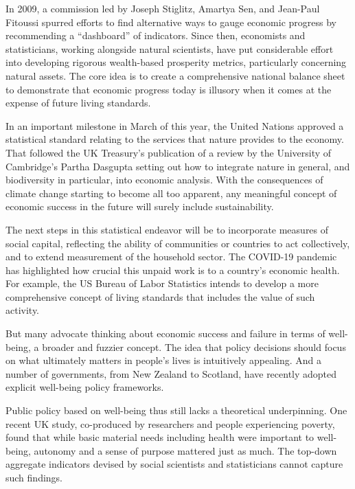 \documentclass[
]{book}
\begin{document}
In 2009, a commission led by Joseph Stiglitz, Amartya Sen, and Jean-Paul Fitoussi spurred efforts to find alternative ways to gauge economic progress by recommending a ``dashboard'' of indicators. Since then, economists and statisticians, working alongside natural scientists, have put considerable effort into developing rigorous wealth-based prosperity metrics, particularly concerning natural assets. The core idea is to create a comprehensive national balance sheet to demonstrate that economic progress today is illusory when it comes at the expense of future living standards.

In an important milestone in March of this year, the United Nations approved a statistical standard relating to the services that nature provides to the economy. That followed the UK Treasury's publication of a review by the University of Cambridge's Partha Dasgupta setting out how to integrate nature in general, and biodiversity in particular, into economic analysis. With the consequences of climate change starting to become all too apparent, any meaningful concept of economic success in the future will surely include sustainability.

The next steps in this statistical endeavor will be to incorporate measures of social capital, reflecting the ability of communities or countries to act collectively, and to extend measurement of the household sector. The COVID-19 pandemic has highlighted how crucial this unpaid work is to a country's economic health. For example, the US Bureau of Labor Statistics intends to develop a more comprehensive concept of living standards that includes the value of such activity.

But many advocate thinking about economic success and failure in terms of well-being, a broader and fuzzier concept. The idea that policy decisions should focus on what ultimately matters in people's lives is intuitively appealing. And a number of governments, from New Zealand to Scotland, have recently adopted explicit well-being policy frameworks.

Public policy based on well-being thus still lacks a theoretical underpinning.
One recent UK study, co-produced by researchers and people experiencing poverty, found that while basic material needs including health were important to well-being, autonomy and a sense of purpose mattered just as much. The top-down aggregate indicators devised by social scientists and statisticians cannot capture such findings.
\end{document}
